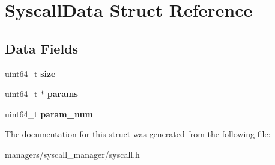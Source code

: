 \hypertarget{structSyscallData}{}\section{Syscall\+Data Struct Reference}
\label{structSyscallData}
\subsection*{Data Fields}
\begin{DoxyCompactItemize}
\item 
uint64\+\_\+t {\bfseries size}\hypertarget{structSyscallData_a264be5f17a2c62e94b5c71deaaae9e12}{}\label{structSyscallData_a264be5f17a2c62e94b5c71deaaae9e12}

\item 
uint64\+\_\+t $\ast$ {\bfseries params}\hypertarget{structSyscallData_a1a795c1e893801734403d984f0a39b09}{}\label{structSyscallData_a1a795c1e893801734403d984f0a39b09}

\item 
uint64\+\_\+t {\bfseries param\+\_\+num}\hypertarget{structSyscallData_acc957a3e8c4f506ca72e85cba3defbb9}{}\label{structSyscallData_acc957a3e8c4f506ca72e85cba3defbb9}

\end{DoxyCompactItemize}


The documentation for this struct was generated from the following file\+:\begin{DoxyCompactItemize}
\item 
managers/syscall\+\_\+manager/syscall.\+h\end{DoxyCompactItemize}
